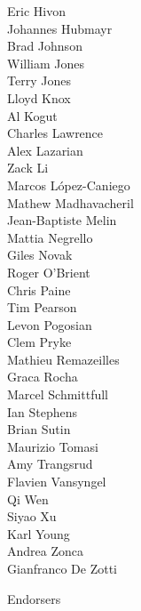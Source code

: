 \documentclass[PICOReport.tex]{subfiles}
\begin{document}
{\begin{multicols}{4}
Eric Hivon                      \\	
Johannes Hubmayr                \\	
Brad Johnson                    \\	
William Jones                   \\	
Terry Jones                     \\	
Lloyd Knox                      \\	
Al Kogut                        \\	
Charles Lawrence                \\	
Alex Lazarian                   \\	
Zack Li                         \\	
Marcos L\'{o}pez-Caniego        \\	
Mathew Madhavacheril            \\	
Jean-Baptiste Melin             \\	
Mattia Negrello                 \\	
Giles Novak                     \\	
Roger O'Brient                  \\	
Chris Paine                     \\	
Tim Pearson                     \\	
Levon Pogosian                  \\	
Clem Pryke                      \\	
Mathieu Remazeilles             \\	
Graca Rocha                     \\	
Marcel Schmittfull              \\	
Ian Stephens                    \\	
Brian Sutin                     \\	
Maurizio Tomasi                 \\	
Amy Trangsrud                   \\	
Flavien Vansyngel               \\	
Qi Wen                          \\	
Siyao Xu                        \\	
Karl Young                      \\	
Andrea Zonca                    \\	
Gianfranco De Zotti            	
\end{multicols}
}

\Large { \centerline {Endorsers}}
\end{document}
